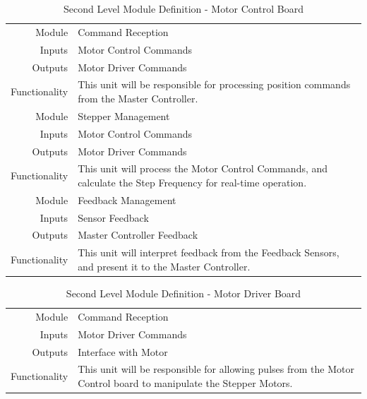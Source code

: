 \begin{table}[H] 
	\caption{Second Level Module Definition - Motor Control Board}
	\label{table:secondlevelmotor}
	\centering 
	\begin{tabular}{|r p{10cm}|} 
		\hline\hline 
		Module		& Command Reception \\ 
		Inputs		& Motor Control Commands	\\ 
		Outputs		& Motor Driver Commands \\ 
		Functionality	& This unit will be responsible for processing position commands from the Master Controller.\\ 
		\hline\hline 
		Module		& Stepper Management \\ 
		Inputs		& Motor Control Commands \\ 
		Outputs		& Motor Driver Commands \\ 
		Functionality	& This unit will process the Motor Control Commands, and calculate the Step Frequency for real-time operation.\\
		\hline\hline  
		Module		& Feedback Management \\ 
		Inputs		& Sensor Feedback \\ 
		Outputs		& Master Controller Feedback \\ 
		Functionality	& This unit will interpret feedback from the Feedback Sensors, and present it to the Master Controller. \\
		\hline
		\end{tabular} 
\end{table}

\begin{table}[H] 
	\caption{Second Level Module Definition - Motor Driver Board}
	\label{table:secondleveldriver}
	\centering 
	\begin{tabular}{|r p{10cm}|} 
		\hline\hline 
		Module		& Command Reception \\ 
		Inputs		& Motor Driver Commands	\\ 
		Outputs		& Interface with Motor \\ 
		Functionality	& This unit will be responsible for allowing pulses from the Motor Control board to manipulate the Stepper Motors.\\
		\hline
		\end{tabular} 
\end{table}